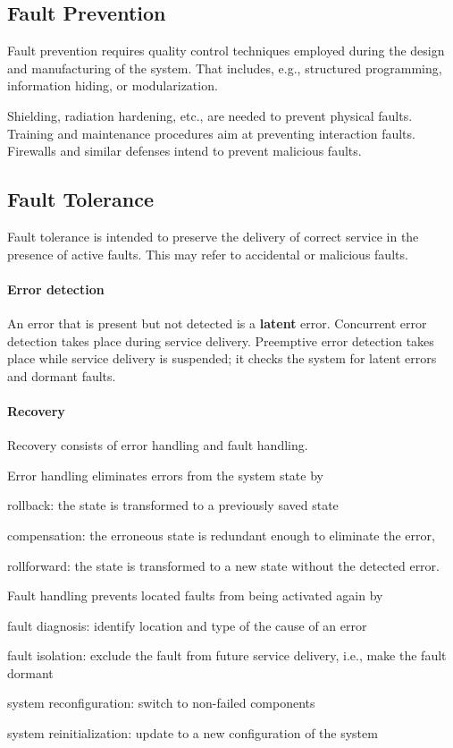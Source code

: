 \subsection{Fault Prevention}

Fault prevention requires quality control techniques employed during the design and manufacturing of the system.
That includes, e.g., structured programming, information hiding, or modularization.

Shielding, radiation hardening, etc., are needed to prevent physical faults.
Training and maintenance procedures aim at preventing interaction faults.
Firewalls and similar defenses intend to prevent malicious faults.

\subsection{Fault Tolerance}

Fault tolerance is intended to preserve the delivery of correct service in the presence of active faults.
This may refer to accidental or malicious faults.

\paragraph{Error detection}
An error that is present but not detected is a \textbf{latent} error. 
Concurrent error detection takes place during service delivery.
Preemptive error detection takes place while service delivery is suspended; it checks the
system for latent errors and dormant faults.

\paragraph{Recovery}
Recovery consists of error handling and fault handling.

Error handling eliminates errors from the system state by
\begin{compactitem}
  \item rollback: the state is transformed to a previously saved state
  \item compensation: the erroneous state is redundant enough to eliminate the error,
  \item rollforward: the state is transformed to a new state without the detected error.
\end{compactitem}

Fault handling prevents located faults from being activated again by
\begin{compactitem}
  \item fault diagnosis: identify location and type of the cause of an error
  \item fault isolation: exclude the fault from future service delivery, i.e., make the fault dormant
  \item system reconfiguration: switch to non-failed components
  \item system reinitialization: update to a new configuration of the system
\end{compactitem}

